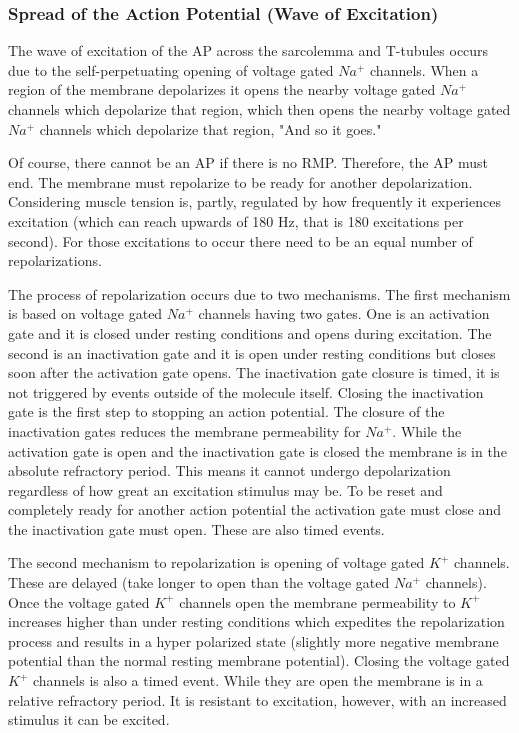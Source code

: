 \subsubsection{Spread of the Action Potential (Wave of Excitation)}

The wave of excitation of the AP across the sarcolemma and T-tubules occurs due to the self-perpetuating opening of voltage gated $Na^+$ channels. When a region of the membrane depolarizes it opens the nearby voltage gated $Na^+$ channels which depolarize that region, which then opens the nearby voltage gated $Na^+$ channels which depolarize that region, "And so it goes."\footnotemark{}

Of course, there cannot be an AP if there is no RMP. Therefore, the AP must end. The membrane must repolarize to be ready for another depolarization. Considering muscle tension is, partly, regulated by how frequently it experiences excitation (which can reach upwards of 180 Hz, that is 180 excitations per second). For those excitations to occur there need to be an equal number of repolarizations.

The process of repolarization occurs due to two mechanisms. The first mechanism is based on voltage gated $Na^+$ channels having two gates. One is an activation gate and it is closed under resting conditions and opens during excitation. The second is an inactivation gate and it is open under resting conditions but closes soon after the activation gate opens. The inactivation gate closure is timed, it is not triggered by events outside of the molecule itself. Closing the inactivation gate is the first step to stopping an action potential. The closure of the inactivation gates reduces the membrane permeability for $Na^+$. While the activation gate is open and the inactivation gate is closed the membrane is in the absolute refractory period. This means it cannot undergo depolarization regardless of how great an excitation stimulus may be. To be reset and completely ready for another action potential the activation gate must close and the inactivation gate must open. These are also timed events. 

The second mechanism to repolarization is opening of voltage gated $K^+$ channels. These are delayed (take longer to open than the voltage gated $Na^+$ channels). Once the voltage gated $K^+$ channels open the membrane permeability to $K^+$ increases higher than under resting conditions which expedites the repolarization process and results in a hyper polarized state (slightly more negative membrane potential than the normal resting membrane potential). Closing the voltage gated $K^+$ channels is also a timed event. While they are open the membrane is in a relative refractory period. It is resistant to excitation, however, with an increased stimulus it can be excited.

